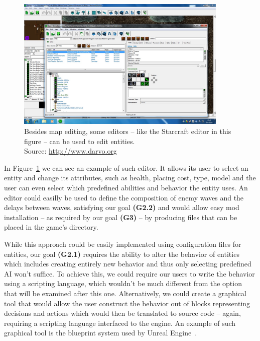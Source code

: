 \begin{figure}[h]
    \centering
    \includegraphics[width=0.9\textwidth]{../img/sc_editor.jpg}
    \caption{Besides map editing, some editors -- like the Starcraft editor in this figure -- can be used to edit entities.
             \\Source: \href{http://www.darvo.org/images/Tutorials\%20Starcraft\%202/Adding\%20Units\%20to\%20a\%20Building\%20part\%201.jpg}
             {http://www.darvo.org}}
    \label{sc-editor}
\end{figure}

In Figure~\ref{sc-editor} we can see an example of such editor.
It allows its user to select an entity and change its attributes, such as health, placing cost, type, model and the user can even 
select which predefined abilities and behavior the entity uses. An editor could easilly be used to define the composition of enemy
waves and the delays between waves, satisfying our goal \textbf{(G2.2)} and would allow easy mod installation -- as required by our goal
\textbf{(G3)} -- by producing files that can be placed in the game's directory.

While this approach could be easily implemented using configuration files for entities, our goal \textbf{(G2.1)} requires the ability
to alter the behavior of entities which includes creating entirely new behavior and thus only selecting predefined AI won't suffice.
To achieve this, we could require our users to write the behavior using a scripting language, which wouldn't be much different
from the option that will be examined after this one. Alternatively, we could create a graphical tool that would allow the user
construct the behavior out of blocks
representing decisions and actions which would then be translated to source code -- again, requiring a scripting language interfaced
to the engine. An example of such graphical tool is the blueprint system used by Unreal Engine~\cite{UE}.

